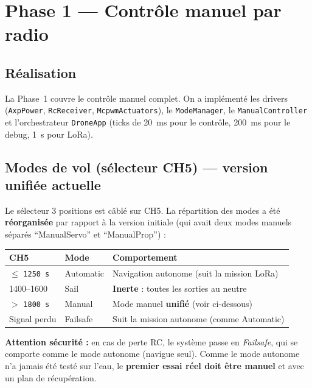 \documentclass[12pt,a4paper]{article}
\newcommand{\us}[1]{\texttt{#1\,\textmu s}}
\newcommand{\file}[1]{\texttt{#1}}
\begin{document}
\section{Phase 1 --- Contr\^ole manuel par radio}

\subsection{R\'ealisation}

La Phase~1 couvre le contr\^ole manuel complet. On a impl\'ement\'e les drivers
(\file{AxpPower}, \file{RcReceiver}, \file{McpwmActuators}), le \file{ModeManager},
le \file{ManualController} et l'orchestrateur \file{DroneApp} (ticks de 20~ms pour
le contr\^ole, 200~ms pour le debug, 1~s pour LoRa).

\subsection{Modes de vol (s\'electeur CH5) --- version unifi\'ee actuelle}

Le s\'electeur 3 positions est c\^abl\'e sur CH5. La r\'epartition des modes a \'et\'e
\textbf{r\'eorganis\'ee} par rapport à la version initiale (qui avait deux modes
manuels s\'epar\'es ``ManualServo'' et ``ManualProp'') :

\begin{longtable}{C{2.6cm} C{2.4cm} L{8cm}}
  \toprule
  \textcolor{tableheadfg}{\textbf{CH5}} &
  \textcolor{tableheadfg}{\textbf{Mode}} &
  \textcolor{tableheadfg}{\textbf{Comportement}} \\
  \midrule
  \endhead
  \bottomrule
  \endfoot
  $\leq$ \us{1250} & Automatic & Navigation autonome (suit la mission LoRa) \\[3pt]
  1400--1600 & Sail & \textbf{Inerte} : toutes les sorties au neutre \\[3pt]
  $>$ \us{1800} & Manual & Mode manuel \textbf{unifi\'e} (voir ci-dessous) \\[3pt]
  Signal perdu & Failsafe & Suit la mission autonome (comme Automatic) \\
\end{longtable}

\begin{warningbox}
  \textbf{Attention s\'ecurit\'e :} en cas de perte RC, le syst\`eme passe en
  \emph{Failsafe}, qui se comporte comme le mode autonome (navigue seul). Comme le
  mode autonome n'a jamais \'et\'e test\'e sur l'eau, le \textbf{premier essai r\'eel
  doit \^etre manuel} et avec un plan de r\'ecup\'eration.
\end{warningbox}
\end{document}
